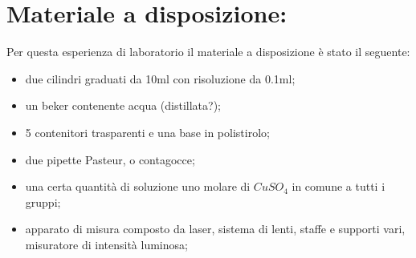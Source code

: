 \section{Materiale a disposizione:}

Per questa esperienza di laboratorio il materiale a disposizione è stato il seguente:
\begin{itemize}
	\item{due cilindri graduati da 10$\si{\milli\litre}$ con risoluzione da 0.1$\si{\milli\litre}$;}
    \item{un beker contenente acqua (distillata?);}
	\item{5 contenitori trasparenti e una base in polistirolo;}
	\item{due pipette Pasteur, o contagocce;}
	\item{una certa quantità di soluzione uno molare di $CuSO_4$ in comune a tutti i gruppi;}
	\item{apparato di misura composto da laser, sistema di lenti, staffe e supporti vari, misuratore di intensità luminosa;}
\end{itemize}
